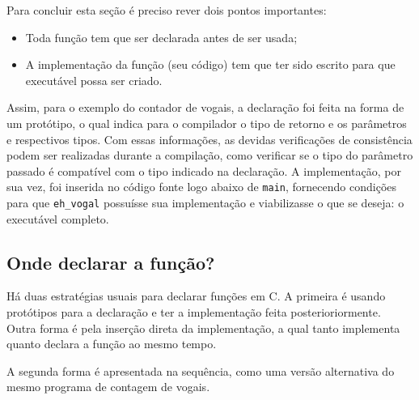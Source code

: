 \documentclass[
  11pt,
  a4paper,
]{scrbook}
\providecommand{\tightlist}{%
  \setlength{\itemsep}{0pt}\setlength{\parskip}{0pt}}\usepackage{longtable,booktabs,array}
\begin{document}
Para concluir esta seção é preciso rever dois pontos importantes:

\begin{itemize}
\tightlist
\item
  Toda função tem que ser declarada antes de ser usada;
\item
  A implementação da função (seu código) tem que ter sido escrito para
  que executável possa ser criado.
\end{itemize}

Assim, para o exemplo do contador de vogais, a declaração foi feita na
forma de um protótipo, o qual indica para o compilador o tipo de retorno
e os parâmetros e respectivos tipos. Com essas informações, as devidas
verificações de consistência podem ser realizadas durante a compilação,
como verificar se o tipo do parâmetro passado é compatível com o tipo
indicado na declaração. A implementação, por sua vez, foi inserida no
código fonte logo abaixo de \texttt{main}, fornecendo condições para que
\texttt{eh\_vogal} possuísse sua implementação e viabilizasse o que se
deseja: o executável completo.

\subsection{Onde declarar a função?}\label{onde-declarar-a-funuxe7uxe3o}

Há duas estratégias usuais para declarar funções em C. A primeira é
usando protótipos para a declaração e ter a implementação feita
posterioriormente. Outra forma é pela inserção direta da implementação,
a qual tanto implementa quanto declara a função ao mesmo tempo.

A segunda forma é apresentada na sequência, como uma versão alternativa
do mesmo programa de contagem de vogais.
\end{document}
